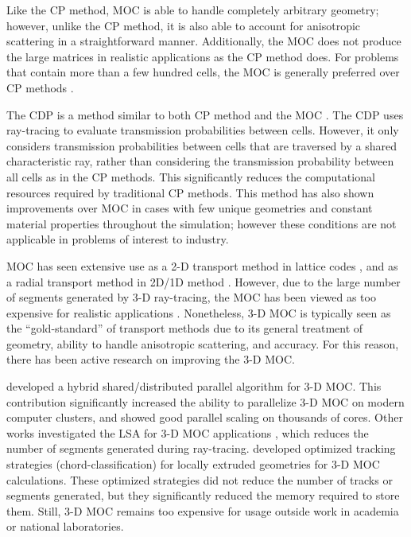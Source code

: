 {{{      Like the \ac{CP} method, \ac{MOC} is able to handle completely arbitrary geometry; however, unlike the \ac{CP} method, it is also able to account for anisotropic scattering in a straightforward manner.
      Additionally, the \ac{MOC} does not produce the large matrices in realistic applications as the \ac{CP} method does.
      For problems that contain more than a few hundred cells, the \ac{MOC} is generally preferred over \ac{CP} methods \cite{Hebert2010}.

      The \ac{CDP} is a method similar to both \ac{CP} method and the \ac{MOC} \cite{Hong1999,Liu2014}.
      The \ac{CDP} uses ray-tracing to evaluate transmission probabilities between cells.
      However, it only considers transmission probabilities between cells that are traversed by a shared characteristic ray, rather than considering the transmission probability between all cells as in the \ac{CP} methods.
      This significantly reduces the computational resources required by traditional \ac{CP} methods.
      This method has also shown improvements over \ac{MOC} in cases with few unique geometries and constant material properties throughout the simulation; however these conditions are not applicable in problems of interest to industry.

      \ac{MOC} has seen extensive use as a 2-D transport method in lattice codes \cite{CASMO-4,Ferrer2016}, and as a radial transport method in 2D/1D method \cite{MPACT2016,Collins2016,DeCART,Lee2006}.
      However, due to the large number of segments generated by 3-D ray-tracing, the \ac{MOC} has been viewed as too expensive for realistic applications \cite{Sanchez2012}.
      Nonetheless, 3-D \ac{MOC} is typically seen as the ``gold-standard'' of transport methods due to its general treatment of geometry, ability to handle anisotropic scattering, and accuracy.
      For this reason, there has been active research on improving the 3-D \ac{MOC}.

      \citet{Kochunas2013} developed a hybrid shared/distributed parallel algorithm for 3-D \ac{MOC}.
      This contribution significantly increased the ability to parallelize 3-D \ac{MOC} on modern computer clusters, and showed good parallel scaling on thousands of cores.
      Other works investigated the \acf{LSA} for 3-D \ac{MOC} applications \cite{Gunow2018}, which reduces the number of segments generated during ray-tracing.
      \citet{Sciannandrone2016} developed optimized tracking strategies (chord-classification) for locally extruded geometries for 3-D \ac{MOC} calculations.
      These optimized strategies did not reduce the number of tracks or segments generated, but they significantly reduced the memory required to store them.
      Still, 3-D \ac{MOC} remains too expensive for usage outside work in academia or national laboratories.

}}}
